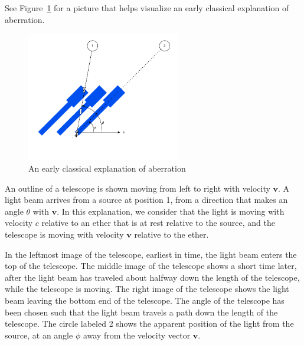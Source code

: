 \documentclass[a4paper]{article}
\theoremstyle{plain}
\theoremstyle{definition}
\newcommand{\vect}[1]{\mathbf{#1}}
\begin{document}
See Figure~\ref{fig:classical-aberration} for a picture that helps
visualize an early classical explanation of aberration.
\begin{figure}[ht]
	\centering
	\includegraphics[width=0.6\textwidth]{classical-aberration-cropped.pdf}
	\caption{An early classical explanation of aberration}
	\label{fig:classical-aberration}
\end{figure}

An outline of a telescope is shown moving from left to right with
velocity $\vect{v}$.  A light beam arrives from a source at position
1, from a direction that makes an angle $\theta$ with $\vect{v}$.  In
this explanation, we consider that the light is moving with velocity
$c$ relative to an ether that is at rest relative to the source, and
the telescope is moving with velocity $\vect{v}$ relative to the
ether.

In the leftmost image of the telescope, earliest in time, the light
beam enters the top of the telescope.  The middle image of the
telescope shows a short time later, after the light beam has traveled
about halfway down the length of the telescope, while the telescope is
moving.  The right image of the telescope shows the light beam leaving
the bottom end of the telescope.  The angle of the telescope has been
chosen such that the light beam travels a path down the length of the
telescope.  The circle labeled 2 shows the apparent position of the
light from the source, at an angle $\phi$ away from the velocity
vector $\vect{v}$.
\end{document}
